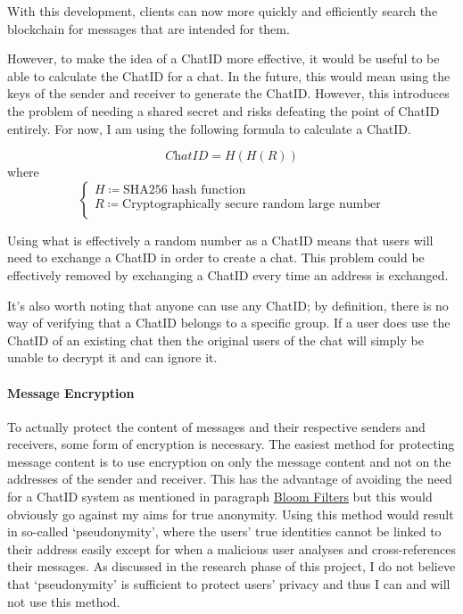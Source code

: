 \documentclass{article}
\begin{document}
With this development, clients can now more quickly and efficiently search the blockchain for messages that are intended for them.

However, to make the idea of a ChatID more effective, it would be useful to be able to calculate the ChatID for a chat. In the future, this would mean using the keys of the sender and receiver to generate the ChatID. However, this introduces the problem of needing a shared secret and risks defeating the point of ChatID entirely. For now, I am using the following formula to calculate a ChatID.

\[ \textit{ChatID} = H(H(\textit{R})) \]
where
\[
    \begin{cases}
        H \coloneqq \textrm{SHA256 hash function} \\[6pt]
        R \coloneqq \textrm{Cryptographically secure random large number} \\[6pt]
    \end{cases}
\]

Using what is effectively a random number as a ChatID means that users will need to exchange a ChatID in order to create a chat. This problem could be effectively removed by exchanging a ChatID every time an address is exchanged.

It's also worth noting that anyone can use any ChatID; by definition, there is no way of verifying that a ChatID belongs to a specific group. If a user does use the ChatID of an existing chat then the original users of the chat will simply be unable to decrypt it and can ignore it.

\paragraph{Message Encryption}
To actually protect the content of messages and their respective senders and receivers, some form of encryption is necessary. The easiest method for protecting message content is to use encryption on only the message content and not on the addresses of the sender and receiver. This has the advantage of avoiding the need for a ChatID system as mentioned in paragraph \href{para:bf}{Bloom Filters} but this would obviously go against my aims for true anonymity. Using this method would result in so-called `pseudonymity', where the users' true identities cannot be linked to their address easily except for when a malicious user analyses and cross-references their messages. As discussed in the research phase of this project, I do not believe that `pseudonymity' is sufficient to protect users' privacy and thus I can and will not use this method.
\end{document}
